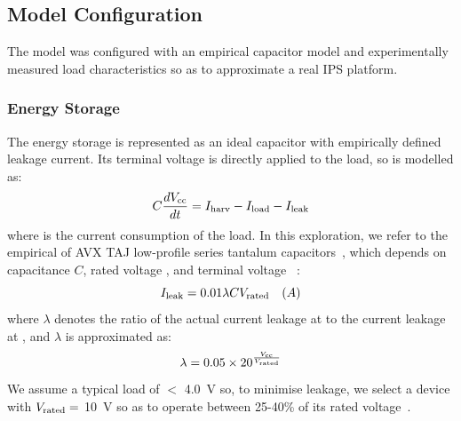 {\subsection{Model Configuration}

The model was configured with an empirical capacitor model and experimentally measured load characteristics so as to approximate a real IPS platform. 

\subsubsection{Energy Storage} \label{ssubsec:estor_model}

The energy storage is represented as an ideal capacitor with empirically defined leakage current. 
Its terminal voltage is directly applied to the load, so is modelled as:
\begin{equation}
  C \frac{dV_{\text{cc}}}{dt} = I_{\text{harv}} - I_{\text{load}} - I_{\text{leak}}
\end{equation}
where  is the current consumption of the load. 
In this exploration, we refer to the empirical  of AVX TAJ low-profile series tantalum capacitors~\cite{tancap1}, which depends on capacitance $C$, rated voltage , and terminal voltage ~\cite{avxleakage}:
\begin{equation}
    I_{\text{leak}} = 0.01 \lambda C V_{\text{rated}} \quad (A)
\end{equation}
where $\lambda$ denotes the ratio of the actual current leakage at  to the current leakage at , and $\lambda$ is approximated as: 
\begin{equation}
    \lambda = 0.05 \times 20^{\frac{V_{\text{cc}}}{V_{\text{rated}}}}
\end{equation}
We assume a typical load of $<$ \SI{4.0}{\volt} so, to minimise leakage, we select a device with $V_{\text{rated}} =$ \SI{10}{\volt} so as to operate between 25-40\% of its rated voltage~\cite{avxleakage}. 


}
